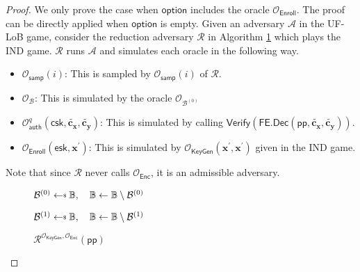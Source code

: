 \begin{proof}
\label{proof:ind-uf-lob1}
	We only prove the case when $\textsf{option}$ includes the oracle $\mathcal{O}_{\textsf{Enroll}}$. The proof can be directly applied when $\textsf{option}$ is empty. Given an adversary $\mathcal{A}$ in the \textsf{UF-LoB} game, consider the reduction adversary $\mathcal{R}$ in Algorithm \ref{alg:reduction-ind-uf-lob1_game} which plays the \textsf{IND} game. $\mathcal{R}$ runs $\mathcal{A}$ and simulates each oracle in the following way.

\begin{itemize}
	\item $\mathcal{O}_{\textsf{samp}}(i)$: This is sampled by $\mathcal{O}_{\textsf{samp}}(i)$ of $\mathcal{R}$.
	
	\item $\mathcal{O}_{\mathcal{B}}$: This is simulated by the oracle $\mathcal{O}_{\mathcal{B}^{(0)}}$

	\item $\mathcal{O}_{\textsf{auth}}^q (\textsf{csk}, \mathbf{\tilde{c_x}}, \mathbf{\tilde{c_y}})$: This is simulated by calling $\textsf{Verify}( \textsf{FE.Dec}(\textsf{pp}, \mathbf{\tilde{c_x}}, \mathbf{\tilde{c_y}}) )$.

	\item $\mathcal{O}_{\textsf{Enroll}}( \textsf{esk}, \mathbf{x}^\prime )$: This is simulated by $\mathcal{O}_{\textsf{KeyGen}}(\mathbf{x}^\prime, \mathbf{x}^\prime)$ given in the \textsf{IND} game.

\end{itemize}
	
\noindent Note that since $\mathcal{R}$ never calls $\mathcal{O}_{\textsf{Enc}}$, it is an admissible adversary.

\begin{figure}[h]
\centering
	
	\begin{minipage}[t]{0.5\linewidth}
	\centering
	\begin{algorithm}[H]
		\caption{$\mathcal{R}^{\mathcal{O}_{\textsf{KeyGen}}, \mathcal{O}_{\textsf{Enc}}}(\textsf{pp})$}
	\label{alg:reduction-ind-uf-lob1_game}
	\begin{algorithmic}[1]
		\State $\mathcal{B}^{(0)} \getsdollar \mathbb{B}, \quad \mathbb{B} \gets \mathbb{B} \setminus \mathcal{B}^{(0)}$

		\State $\mathcal{B}^{(1)} \getsdollar \mathbb{B}, \quad \mathbb{B} \gets \mathbb{B} \setminus \mathcal{B}^{(1)}$


\end{algorithmic}
\end{algorithm}
\end{minipage}
\end{figure}
\end{proof}
